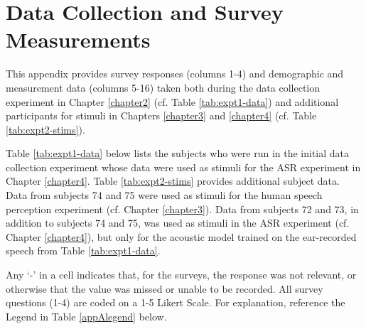 % 
% 
% 


% 
\chapter{Data Collection and Survey Measurements}\label{appendixA}

This appendix provides survey responses (columns 1-4) and demographic and measurement data (columns 5-16) taken both during the data collection experiment in Chapter \ref{chapter2} (cf. Table \ref{tab:expt1-data}) and additional participants for stimuli in Chapters \ref{chapter3} and \ref{chapter4} (cf. Table \ref{tab:expt2-stims}).

Table \ref{tab:expt1-data} below lists the subjects who were run in the initial data collection experiment whose data were used as stimuli for the ASR experiment in Chapter \ref{chapter4}.  Table \ref{tab:expt2-stims} provides additional subject data.  Data from subjects 74 and 75 were used as stimuli for the human speech perception experiment (cf. Chapter \ref{chapter3}).  Data from subjects 72 and 73, in addition to subjects 74 and 75, was used as stimuli in the ASR experiment (cf. Chapter \ref{chapter4}), but only for the acoustic model trained on the ear-recorded speech from Table \ref{tab:expt1-data}.   

Any `-' in a cell indicates that, for the surveys, the response was not relevant, or otherwise that the value was missed or unable to be recorded.  All survey questions (1-4) are coded on a 1-5 Likert Scale.  For explanation, reference the Legend in Table \ref{appAlegend} below.

